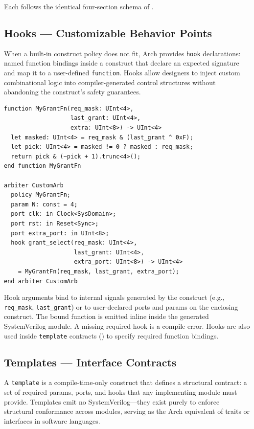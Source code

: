 \documentclass[11pt,twocolumn]{article}
\begin{document}
Each follows the identical four-section schema of .

\subsection{Hooks --- Customizable Behavior Points}\label{sec:hooks}

When a built-in construct policy does not fit, Arch provides \texttt{hook} declarations: named function bindings inside a construct that declare an expected signature and map it to a user-defined \texttt{function}. Hooks allow designers to inject custom combinational logic into compiler-generated control structures without abandoning the construct's safety guarantees.

\begin{lstlisting}[language=Arch,caption={Custom arbiter policy via hook},label={lst:hook}]
function MyGrantFn(req_mask: UInt<4>,
                   last_grant: UInt<4>,
                   extra: UInt<8>) -> UInt<4>
  let masked: UInt<4> = req_mask & (last_grant ^ 0xF);
  let pick: UInt<4> = masked != 0 ? masked : req_mask;
  return pick & (~pick + 1).trunc<4>();
end function MyGrantFn

arbiter CustomArb
  policy MyGrantFn;
  param N: const = 4;
  port clk: in Clock<SysDomain>;
  port rst: in Reset<Sync>;
  port extra_port: in UInt<8>;
  hook grant_select(req_mask: UInt<4>,
                    last_grant: UInt<4>,
                    extra_port: UInt<8>) -> UInt<4>
    = MyGrantFn(req_mask, last_grant, extra_port);
end arbiter CustomArb
\end{lstlisting}

Hook arguments bind to internal signals generated by the construct (e.g., \texttt{req\_mask}, \texttt{last\_grant}) or to user-declared ports and params on the enclosing construct. The bound function is emitted inline inside the generated SystemVerilog module. A missing required hook is a compile error. Hooks are also used inside \texttt{template} contracts () to specify required function bindings.

\subsection{Templates --- Interface Contracts}\label{sec:templates}

A \texttt{template} is a compile-time-only construct that defines a structural contract: a set of required params, ports, and hooks that any implementing module must provide. Templates emit no SystemVerilog---they exist purely to enforce structural conformance across modules, serving as the Arch equivalent of traits or interfaces in software languages.
\end{document}

